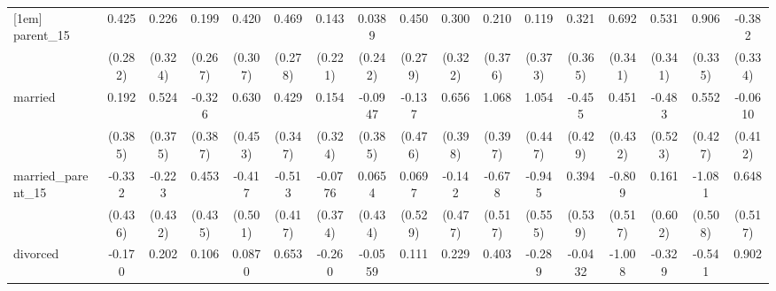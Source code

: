 {\begin{tabular}{l*{16}{c}}
[1em]
parent\_15           &       0.425         &       0.226         &       0.199         &       0.420         &       0.469         &       0.143         &      0.0389         &       0.450         &       0.300         &       0.210         &       0.119         &       0.321         &       0.692\sym{*}  &       0.531         &       0.906\sym{**} &      -0.382         \\
                    &     (0.282)         &     (0.324)         &     (0.267)         &     (0.307)         &     (0.278)         &     (0.221)         &     (0.242)         &     (0.279)         &     (0.322)         &     (0.376)         &     (0.373)         &     (0.365)         &     (0.341)         &     (0.341)         &     (0.335)         &     (0.334)         \\
[1em]
married             &       0.192         &       0.524         &      -0.326         &       0.630         &       0.429         &       0.154         &     -0.0947         &      -0.137         &       0.656         &       1.068\sym{**} &       1.054\sym{*}  &      -0.455         &       0.451         &      -0.483         &       0.552         &     -0.0610         \\
                    &     (0.385)         &     (0.375)         &     (0.387)         &     (0.453)         &     (0.347)         &     (0.324)         &     (0.385)         &     (0.476)         &     (0.398)         &     (0.397)         &     (0.447)         &     (0.429)         &     (0.432)         &     (0.523)         &     (0.427)         &     (0.412)         \\
[1em]
married\_parent\_15   &      -0.332         &      -0.223         &       0.453         &      -0.417         &      -0.513         &     -0.0776         &      0.0654         &      0.0697         &      -0.142         &      -0.678         &      -0.945         &       0.394         &      -0.809         &       0.161         &      -1.081\sym{*}  &       0.648         \\
                    &     (0.436)         &     (0.432)         &     (0.435)         &     (0.501)         &     (0.417)         &     (0.374)         &     (0.434)         &     (0.529)         &     (0.477)         &     (0.517)         &     (0.555)         &     (0.539)         &     (0.517)         &     (0.602)         &     (0.508)         &     (0.517)         \\
[1em]
divorced            &      -0.170         &       0.202         &       0.106         &      0.0870         &       0.653         &      -0.260         &     -0.0559         &       0.111         &       0.229         &       0.403         &      -0.289         &     -0.0432         &      -1.008\sym{*}  &      -0.329         &      -0.541         &       0.902\sym{*}  \\

\end{tabular}}
